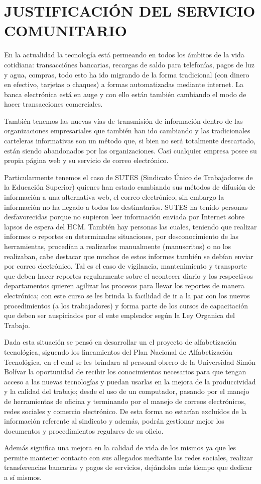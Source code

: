 \chapter{JUSTIFICACIÓN DEL SERVICIO COMUNITARIO}
        En la actualidad la tecnología está permeando en todos los ámbitos de la vida cotidiana: transacciónes bancarias, recargas de saldo para telefonías, pagos de luz y agua, compras, todo esto ha ido migrando de la forma tradicional (con dinero en efectivo, tarjetas o chaques) a formas automatizadas mediante internet. La banca electrónica está en auge y con ello están también cambiando el modo de hacer transacciones comerciales.
        
        También tenemos las nuevas vías de transmisión de información dentro de las organizaciones empresariales que también han ido cambiando y las tradicionales carteleras informativas son un método que, si bien no será totalmente descartado, están siendo abandonados por las organizaciones. Casi cualquier empresa posee su propia página web y su servicio de correo electrónico.

		Particularmente tenemos el caso de SUTES (Sindicato Único de Trabajadores de la Educación Superior) quienes han estado cambiando sus métodos de difusión de información a una alternativa web, el correo electrónico, sin embargo la información no ha llegado a todos los destinatarios. SUTES ha tenido personas desfavorecidas porque no supieron leer información enviada por Internet sobre lapsos de espera del HCM. También hay personas las cuales, teniendo que realizar informes o reportes en determinadas situaciones, por desconocimiento de las herramientas, procedían a realizarlos manualmente (manuscritos) o no los realizaban, cabe destacar que muchos de estos informes también se debían enviar por correo electrónico. Tal es el caso de vigilancia, mantenimiento y transporte que deben hacer reportes regularmente sobre el acontecer diario y los respectivos departamentos quieren agilizar los procesos para llevar los reportes de manera electrónica; con este curso se les brinda la facilidad de ir a la par con los nuevos procedimientos (a los trabajadores) y forma parte de los cursos de capacitación que deben ser auspiciados por el ente empleador según la Ley Organica del Trabajo.
        
        Dada esta situación se pensó en desarrollar un el proyecto de alfabetización tecnológica, siguendo los lineamientos del Plan Nacional de Alfabetización Tecnológica\cite{infocentro,PNAT}, en el cual se les brindara al personal obrero de la Universidad Simón Bolívar la oportunidad de recibir los conocimientos necesarios para que tengan acceso a las nuevas tecnologías y puedan usarlas en la mejora de la produccividad y la calidad del trabajo; desde el uso de un computador, pasando por el manejo de herramientas de oficina y terminando por el manejo de correos electrónicos, redes sociales y comercio electrónico. De esta forma no estarían excluídos de la información referente al sindicato y además, podrán gestionar mejor los documentos y procedimientos regulares de su oficio.
        
        Además significa una mejora en la calidad de vida de los mismos ya que les permite mantener contacto con sus allegados mediante las redes sociales, realizar transferencias bancarias y pagos de servicios, dejándoles más tiempo que dedicar a sí mismos.
	\pagebreak